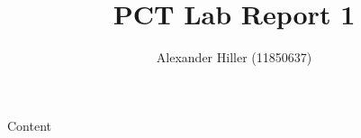 \documentclass{article}
\begin{document}
\title{PCT Lab Report 1}
\author{Alexander Hiller (11850637)}
\maketitle

\newpage

Content
\end{document}
